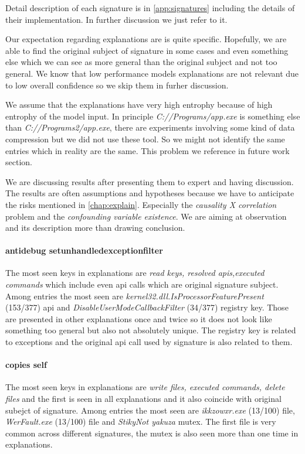 Detail description of each signature is in \ref{app:signatures} including the details of their implementation. In further discussion we just refer to it.


Our expectation regarding explanations are is quite specific. Hopefully, we are able to find the original subject of signature in some cases and even something else which we can see as more general than the original subject and not too general. We know that low performance models explanations are not relevant due to low overall confidence so we skip them in furher discussion.

We assume that the explanations have very high entrophy because of high entrophy of the model input. In principle \emph{C://Programs/app.exe} is something else than \emph{C://Programs2/app.exe}, there are experiments involving some kind of data compression but we did not use these tool. So we might not identify the same entries which in reality are the same. This problem we reference in future work section.

We are discussing results after presenting them to expert and having discussion. The results are often assumptions and hypotheses because we have to anticipate the risks mentioned in \ref{chap:explain}. Especially the \emph{causality X correlation} problem and the \emph{confounding variable existence}. We are aiming at observation and its description more than drawing conclusion.


\paragraph{antidebug setunhandledexceptionfilter}
The most seen keys in explanations are \emph{read keys, resolved apis,executed commands} which include even api calls which are original signature subject. Among entries the most seen are \emph{kernel32.dll.IsProcessorFeaturePresent} (153/377) api and \emph{DisableUserModeCallbackFilter} (34/377) registry key. Those are presented in other explanations once and twice so it does not look like something too general but also not absolutely unique. The registry key is related to exceptions and the original api call used by signature is also related to them.

\paragraph{copies self}
The most seen keys in explanations are \emph{write files, executed commands, delete files} and the first is seen in all explanations and it also coincide with original subejct of signature. Among entries the most seen are \emph{ikkzowxr.exe} (13/100) file, \emph{WerFault.exe} (13/100) file and \emph{StikyNot yakuza} mutex. The first file is very common across different signatures, the mutex is also seen more than one time in explanations.


